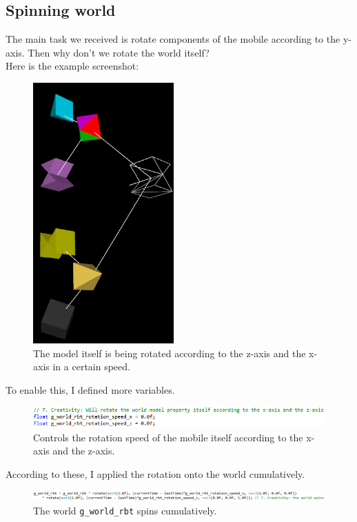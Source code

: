 \documentclass[11pt]{article}
\begin{document}
\subsection{Spinning world} \label{ssec:6.3}
The main task we received is rotate components of the mobile according to the y-axis. Then why don't we rotate the world itself? \\
Here is the example screenshot:
\begin{figure}[htb]
	\begin{center}
		\includegraphics[height=10cm,width=0.6\linewidth]{additionalRotation.png}
	\end{center}
	\caption{The model itself is being rotated according to the z-axis and the x-axis in a certain speed.}
\end{figure}
\newpage
To enable this, I defined more variables.
\begin{figure}[htb]
	\begin{center}
		\includegraphics[width=1.0\linewidth]{newVariables.png}
	\end{center}
	\caption{Controls the rotation speed of the mobile itself according to the x-axis and the z-axis.}
\end{figure}

According to these, I applied the rotation onto the world cumulatively.
\begin{figure}[htb]
	\begin{center}
		\includegraphics[width=1.0\linewidth]{worldSpin.png}
	\end{center}
	\caption{The world \texttt{g\_world\_rbt} spins cumulatively.}
\end{figure}
\end{document}
